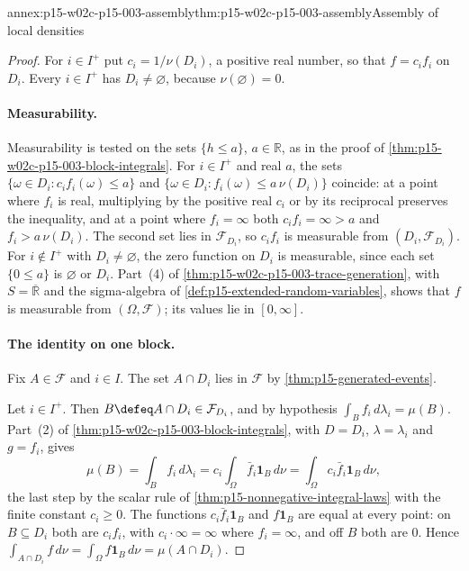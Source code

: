 \begin{annexitem}{annex:p15-w02c-p15-003-assembly}{thm:p15-w02c-p15-003-assembly}{Assembly of local densities}
\begin{proof}
For \(i\in I^+\) put \(c_i=1/\nu(D_i)\), a positive real number, so that
\(f=c_if_i\) on \(D_i\). Every \(i\in I^+\) has \(D_i\neq\varnothing\),
because \(\nu(\varnothing)=0\).

\paragraph{Measurability.}
Measurability is tested on the sets \(\{h\leq a\}\), \(a\in\mathbb R\), as
in the proof of \cref{thm:p15-w02c-p15-003-block-integrals}. For
\(i\in I^+\) and real \(a\), the sets \(\{\omega\in D_i:c_if_i(\omega)\leq a\}\)
and \(\{\omega\in D_i:f_i(\omega)\leq a\,\nu(D_i)\}\) coincide: at a point
where \(f_i\) is real, multiplying by the positive real \(c_i\) or by its
reciprocal preserves the inequality, and at a point where \(f_i=\infty\)
both \(c_if_i=\infty>a\) and \(f_i>a\,\nu(D_i)\). The second set lies in
\(\mathcal F_{D_i}\), so \(c_if_i\) is measurable from
\((D_i,\mathcal F_{D_i})\). For \(i\notin I^+\) with \(D_i\neq\varnothing\),
the zero function on \(D_i\) is measurable, since each set
\(\{0\leq a\}\) is \(\varnothing\) or \(D_i\). Part~(4) of
\cref{thm:p15-w02c-p15-003-trace-generation}, with
\(S=\overline{\mathbb R}\) and the sigma-algebra of
\cref{def:p15-extended-random-variables}, shows that \(f\) is measurable
from \((\Omega,\mathcal F)\); its values lie in \([0,\infty]\).

\paragraph{The identity on one block.}
Fix \(A\in\mathcal F\) and \(i\in I\). The set \(A\cap D_i\) lies in
\(\mathcal F\) by \cref{thm:p15-generated-events}.

Let \(i\in I^+\). Then \(B\defeq A\cap D_i\in\mathcal F_{D_i}\), and by
hypothesis \(\int_Bf_i\,d\lambda_i=\mu(B)\). Part~(2) of
\cref{thm:p15-w02c-p15-003-block-integrals}, with \(D=D_i\),
\(\lambda=\lambda_i\) and \(g=f_i\), gives
\[
 \mu(B)=\int_Bf_i\,d\lambda_i=c_i\int_\Omega\bar f_i\mathbf1_B\,d\nu
       =\int_\Omega c_i\bar f_i\mathbf1_B\,d\nu,
\]
the last step by the scalar rule of
\cref{thm:p15-nonnegative-integral-laws} with the finite constant
\(c_i\geq0\). The functions \(c_i\bar f_i\mathbf1_B\) and
\(f\mathbf1_B\) are equal at every point: on \(B\subseteq D_i\) both are
\(c_if_i\), with \(c_i\cdot\infty=\infty\) where \(f_i=\infty\), and off
\(B\) both are \(0\). Hence
\(\int_{A\cap D_i}f\,d\nu=\int_\Omega f\mathbf1_B\,d\nu=\mu(A\cap D_i)\).


\end{proof}
\end{annexitem}
